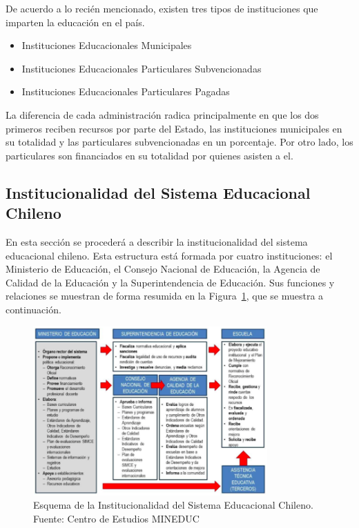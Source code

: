 De acuerdo a lo recién mencionado, existen tres tipos de instituciones que imparten la educación en el país.

\begin{itemize}
\item Instituciones Educacionales Municipales
\item Instituciones Educacionales Particulares Subvencionadas
\item Instituciones Educacionales Particulares Pagadas
\end{itemize}

La diferencia de cada administración radica principalmente en que los dos primeros reciben recursos por parte del Estado, las instituciones municipales en su totalidad y las particulares subvencionadas en un porcentaje. Por otro lado, los particulares son financiados en su totalidad por quienes asisten a el. 


\subsection{Institucionalidad del Sistema Educacional Chileno}

En esta sección se procederá a describir la institucionalidad del sistema educacional chileno. Esta estructura está formada por cuatro instituciones: el Ministerio de Educación, el Consejo Nacional de Educación, la Agencia de Calidad de la Educación y la Superintendencia de Educación. Sus funciones y relaciones se muestran de forma resumida en la Figura~\ref{fig:esquema}, que se muestra a continuación. 

\begin{figure}[H]
  \centering
    \includegraphics[width=0.8\textwidth]{Figuras/Institucionalidad}
      \caption{Esquema de la Institucionalidad del Sistema Educacional Chileno. Fuente: Centro de Estudios MINEDUC}
    \label{fig:esquema}
\end{figure}

